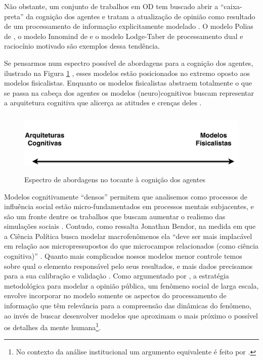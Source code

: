 Não obstante, um conjunto de trabalhos em OD tem buscado abrir a ``caixa-preta''
da cognição dos agentes e tratam a atualização de opinião como resultado de um
processamento de informação explicitamente modelado \cite{flache2017,
  jager2017}. O modelo Polias de , o modelo
Innomind de  e o modelo Lodge-Taber
\cite{kim2010computational,kim2011model} de processamento dual e raciocínio
motivado são exemplos dessa tendência.

Se pensarmos num espectro possível de abordagens para a cognição dos agentes,
ilustrado na Figura \ref{fig4} , esses modelos estão posicionados no extremo oposto aos
modelos fisicalistas. Enquanto os modelos fisicalistas abstraem totalmente o que
se passa na cabeça dos agentes os modelos (neuro)cognitivos buscam representar a
arquitetura cognitiva que alicerça as atitudes e crenças
deles \cite{kim2010computational}.

\begin{figure}[H]
  \centering
  \includegraphics[width = \textwidth, height = 3cm]{ims/line.pdf}
  \caption{Espectro de abordagens no tocante à cognição dos agentes}
  \label{fig4}
\end{figure}

Modelos cognitivamente ``densos'' permitem que analisemos como processos de
influência social estão micro-fundamentados em processos mentais subjacentes, e
são um fronte dentre os trabalhos que buscam aumentar o realismo das simulações
sociais \cite{jager2017,epstein2014agent_zero, conte2013minding}. Contudo, como
ressalta Jonathan Bendor, na medida em que a Ciência Política busca modelar
macrofenômenos ela ``deve ser mais implacável em relação aos micropressupostos
do que microcampos relacionados (como ciência cognitiva)''
\cite[p.45]{bendor2010bounded}. Quanto mais complicados nossos modelos menor
controle temos sobre qual o elemento responsável pelo seus resultados, e mais
dados precisamos para a sua calibração e validação \cite{de2005computational,
  bendor2010bounded}. Como argumentado por , a
estratégia metodológica para modelar a opinião pública, um fenômeno social de
larga escala, envolve incorporar no modelo somente os aspectos do processamento
de informação que têm relevância para a compreensão das dinâmicas do fenômeno,
ao invés de buscar desenvolver modelos que aproximam o mais próximo o possível
os detalhes da mente humana\footnote{No contexto da análise institucional um
  argumento equivalente é feito por .}.


